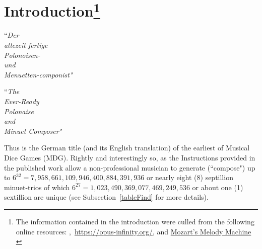 \documentclass[a4paper,x11names,svgnames,10pt]{article}
\begin{document}
\section[Introduction]{Introduction\footnote{The information contained in the introduction were culled from the following online resources:
	\citet{wiki_mw2017},\ 
	\url{https://opus-infinity.org/}, and 
	\href{https://www.sciencenews.org/article/mozarts-melody-machine-0}{Mozart's Melody Machine} \citep*{peterson2001}
	}
}
	\begin{center}
	\begin{minipage}{0.4\textwidth}
	\begin{flushleft}
		\begin{center}
			``\em Der \\ allezeit fertige \\ Polonoisen- \\ und \\ Menuetten-componist"\\
		\end{center}
	\end{flushleft}
	\end{minipage}
	\begin{minipage}{0.4\textwidth}
	\begin{flushright}
		\begin{center}
		``\em The \\ Ever-Ready \\ Polonaise \\ and \\ Minuet Composer"
	\end{center}
	\end{flushright}
	\end{minipage}
	\end{center}

Thus is the German title (and its English translation) of the earliest of Musical Dice Games (MDG).  Rightly and interestingly so, as the Instructions provided in the published work allow a non-professional musician to generate (``compose") up to $6^{32} = 7,\!958,\!661,\!109,\!946,\!400,\!884,\!391,\!936$ or nearly eight (8) septillion minuet-trios of which $6^{27} = 1,\!023,\!490,\!369,\!077,\!469,\!249,\!536$ or about one (1) sextillion are unique (see Subsection~\ref{tableFind} for more details).\\  
\end{document}

